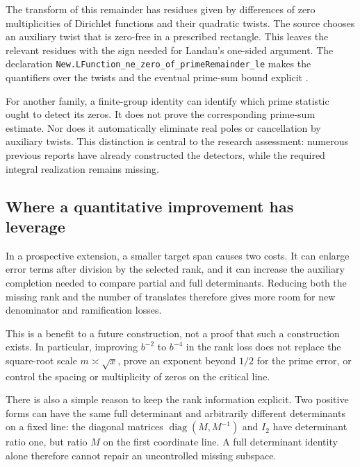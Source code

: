 The transform of this remainder has residues given by differences of
zero multiplicities of Dirichlet functions and their quadratic twists.
The source chooses an auxiliary twist that is zero-free in a prescribed
rectangle. This leaves the relevant residues with the sign needed for
Landau's one-sided argument. The declaration
{\texttt{New.LFunction\_ne\_zero\_of\_primeRemainder\_le}}
makes the quantifiers over the twists and the eventual prime-sum bound
explicit \cite{criterion}.

For another family, a finite-group identity can identify which prime
statistic ought to detect its zeros. It does not prove the corresponding
prime-sum estimate. Nor does it automatically eliminate real poles or
cancellation by auxiliary twists. This distinction is central to the
research assessment: numerous previous reports have already constructed
the detectors, while the required integral realization remains missing.

\subsection{Where a quantitative improvement has leverage}

In a prospective extension, a smaller target span causes two costs.
It can enlarge error terms after division by the selected rank, and it
can increase the auxiliary completion needed to compare partial and full
determinants. Reducing both the missing rank and the number of translates
therefore gives more room for new denominator and ramification losses.

This is a benefit to a future construction, not a proof that such a
construction exists. In particular, improving $b^{-2}$ to $b^{-4}$ in the
rank loss does not replace the square-root scale $m\asymp\sqrt{x}$, prove
an exponent beyond $1/2$ for the prime error, or control the spacing or
multiplicity of zeros on the critical line.

There is also a simple reason to keep the rank information explicit.
Two positive forms can have the same full determinant and arbitrarily
different determinants on a fixed line: the diagonal matrices
$\operatorname{diag}(M,M^{-1})$ and $I_2$ have determinant ratio one,
but ratio $M$ on the first coordinate line. A full determinant identity
alone therefore cannot repair an uncontrolled missing subspace.
